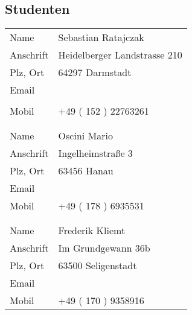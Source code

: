 \subsection{Studenten
}\label{subsec:student}

\begin{tabularx}{0.95\textwidth}{l X}
    Name            & Sebastian Ratajczak
    \\
    Anschrift       & Heidelberger Landstrasse 210
    \\
    Plz, Ort        & 64297 Darmstadt
    \\
    Email   & \sitHref[sebastian.ratajczak@stud.h-da.de]{%
              mailto:sebastian.ratajczak@stud.h-da.de}
    \\ %
            & \sitHref[s.ratajczak@iot-venture.com]{%
              mailto:s.ratajczak@iot-venture.com}
    \\
    Mobil   & +49 ( 152 ) 22763261
    \\ \\ \hline \\
    Name            & Oscini Mario
    \\
    Anschrift       & Ingelheimstraße 3
    \\
    Plz, Ort        & 63456 Hanau
    \\
    Email   & \sitHref[mario.oscini@stud.h-da.de]{%
              mailto:mario.oscini@stud.h-da.de}
    \\
    Mobil   & +49 ( 178 ) 6935531
    \\ \\ \hline \\
    Name            & Frederik Kliemt
    \\
    Anschrift       & Im Grundgewann 36b
    \\
    Plz, Ort        & 63500 Seligenstadt
    \\
    Email   & \sitHref[Frederik.Kliemt@stud.h-da.de]{%
              mailto:Frederik.Kliemt@stud.h-da.de}
    \\
    Mobil   & +49 ( 170 ) 9358916
\end{tabularx}

